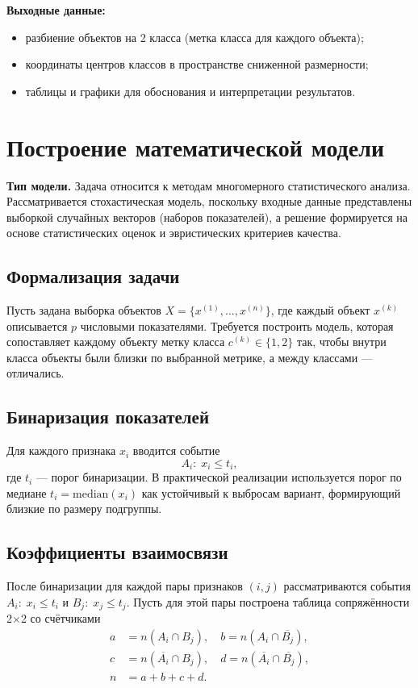 \documentclass[a4paper, 14pt]{extarticle}
\begin{document}
\textbf{Выходные данные:}
\begin{itemize}
  \item разбиение объектов на 2 класса (метка класса для каждого объекта);
  \item координаты центров классов в пространстве сниженной размерности;
  \item таблицы и графики для обоснования и интерпретации результатов.
\end{itemize}

\section{Построение математической модели}\label{sec:build_model}
\textbf{Тип модели.} Задача относится к методам многомерного статистического анализа. Рассматривается стохастическая модель, поскольку входные данные представлены выборкой случайных векторов (наборов показателей), а решение формируется на основе статистических оценок и эвристических критериев качества.

\subsection{Формализация задачи}
Пусть задана выборка объектов $X=\{x^{(1)},\dots,x^{(n)}\}$, где каждый объект $x^{(k)}$ описывается $p$ числовыми показателями. Требуется построить модель, которая сопоставляет каждому объекту метку класса $c^{(k)}\in\{1,2\}$ так, чтобы внутри класса объекты были близки по выбранной метрике, а между классами --- отличались.
\subsection{Бинаризация показателей}
Для каждого признака $x_i$ вводится событие
\[
A_i:\; x_i \le t_i,
\]
где $t_i$ --- порог бинаризации. В практической реализации используется порог по медиане $t_i=\mathrm{median}(x_i)$ как устойчивый к выбросам вариант, формирующий близкие по размеру подгруппы.

\subsection{Коэффициенты взаимосвязи}
После бинаризации для каждой пары признаков $(i,j)$ рассматриваются события $A_i:\;x_i\le t_i$ и $B_j:\;x_j\le t_j$.
Пусть для этой пары построена таблица сопряжённости 2$\times$2 со счётчиками
\[
\begin{aligned}
a&=n(A_i\cap B_j),\quad b=n(A_i\cap \overline{B_j}),\\
c&=n(\overline{A_i}\cap B_j),\quad d=n(\overline{A_i}\cap \overline{B_j}),\\
n&=a+b+c+d.
\end{aligned}
\]
\end{document}
